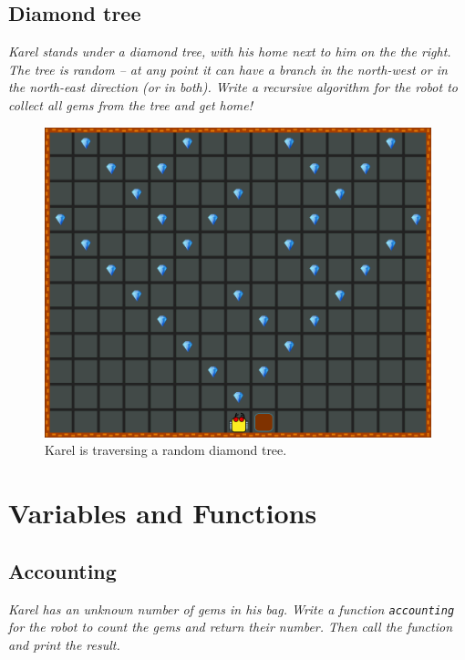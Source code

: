 {{\subsection{Diamond tree}

{\em Karel stands under a diamond tree, with his home next to him on the the right. 
The tree is random -- at any point it can have 
a branch in the north-west or in the north-east direction (or in both). Write a recursive 
algorithm for the robot to collect all gems from the tree and get home!  }

\begin{figure}[!ht]
\begin{center}
\includegraphics[height=0.4\textwidth]{img/g04.png}
\end{center}
\vspace{-4mm}
\caption{Karel is traversing a random diamond tree.}
\label{fig:g04}
\vspace{-10mm}
\end{figure}


\section{Variables and Functions}

\subsection{Accounting}

{\em Karel has an unknown number of gems in his bag. Write a function {\tt accounting} for the 
robot to count the gems and return their number. Then call the function and print the result.}

\newpage

}}
